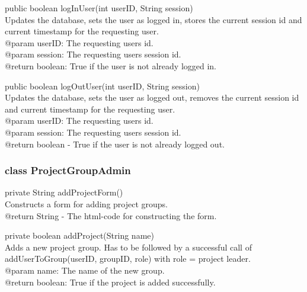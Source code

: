 \documentclass[a4paper]{article}
\begin{document}
\vspace{5mm}
\begin{hangparas}{1.5em}{1}
public boolean logInUser(int userID, String session)\\
Updates the database, sets the user as logged in, stores the current session id and current timestamp for the requesting user.\\
@param userID: The requesting users id.\\
@param session: The requesting users session id.\\
@return boolean: True if the user is not already logged in.
\end{hangparas}

\vspace{5mm}
\begin{hangparas}{1.5em}{1}
public boolean logOutUser(int userID, String session)\\
Updates the database, sets the user as logged out, removes the current session id and current timestamp for the requesting user.\\
@param userID: The requesting users id.\\
@param session: The requesting users session id.\\
@return boolean - True if the user is not already logged out.\\
\end{hangparas}

\subsubsection{class ProjectGroupAdmin}

\begin{hangparas}{1.5em}{1}
private String addProjectForm()\\
Constructs a form for adding project groups.\\
@return String - The html-code for constructing the form.
\end{hangparas}

\vspace{5mm}
\begin{hangparas}{1.5em}{1}
private boolean addProject(String name)\\
Adds a new project group. Has to be followed by a successful call of addUserToGroup(userID, groupID, role) with role = project leader.\\
@param name: The name of the new group.\\
@return boolean: True if the project is added successfully.
\end{hangparas}
\end{document}
